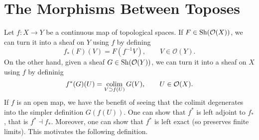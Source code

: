 

\section{The Morphisms Between Toposes}

Let $f : X \to Y$ be a continuous map of topological spaces. If $F \in \operatorname{Sh}(\mathcal{O}(X))$, we can turn it into a sheaf on $Y$ using $f$ by defining
\[ f_*(F)(V) = F(f^{-1}V), \qquad V \in \mathcal{O}(Y). \]
On the other hand, given a sheaf $G \in \operatorname{Sh}(\mathcal{O}(Y))$, we can turn it into a sheaf on $X$ using $f$ by defininig
\[ f^*(G)(U) = \operatorname*{colim}_{V \supset f(U)} G(V), \qquad U \in \mathcal{O}(X). \]
If $f$ is an open map, we have the benefit of seeing that the colimit degenerates into the simpler definition $G(f(U))$. One can show that $f^*$ is left adjoint to $f_*$, that is $f^* \dashv f_*$. Moreover, one can show that $f^*$ is left exact (so preserves finite limits). This motivates the following definition.

